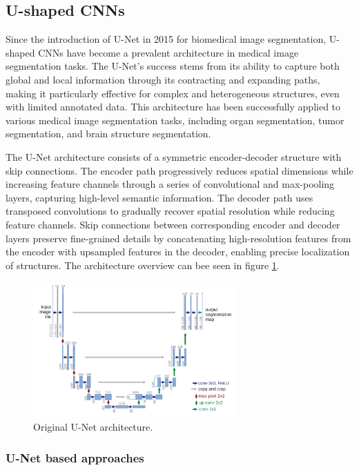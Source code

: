 \subsection{U-shaped \gls{CNN}s}
Since the introduction of U-Net \cite{RonnebergerEtAl2015} in 2015
for biomedical image segmentation, U-shaped \gls{CNN}s have become a
prevalent architecture in medical image segmentation tasks. The
U-Net's success stems from its ability to capture both global and
local information through its contracting and expanding paths, making
it particularly effective for complex and heterogeneous structures,
even with limited annotated data. This architecture has been
successfully applied to various medical image segmentation tasks,
including organ segmentation, tumor segmentation, and brain structure
segmentation.

The U-Net architecture consists of a symmetric encoder-decoder
structure with skip connections. The encoder path progressively
reduces spatial dimensions while increasing feature channels through
a series of convolutional and max-pooling layers, capturing
high-level semantic information. The decoder path uses transposed
convolutions to gradually recover spatial resolution while reducing
feature channels. Skip connections between corresponding encoder and
decoder layers preserve fine-grained details by concatenating
high-resolution features from the encoder with upsampled features in
the decoder, enabling precise localization of structures. The
architecture overview can bee seen in figure \ref{fig:unet_architecture}.

\begin{figure}[h]
  \centering
  \includegraphics[width=0.7\textwidth]{Cap1/Figures/unet_architecture.png}
  \caption{Original U-Net architecture.}
  \label{fig:unet_architecture}
\end{figure}

\subsubsection{U-Net based approaches}

